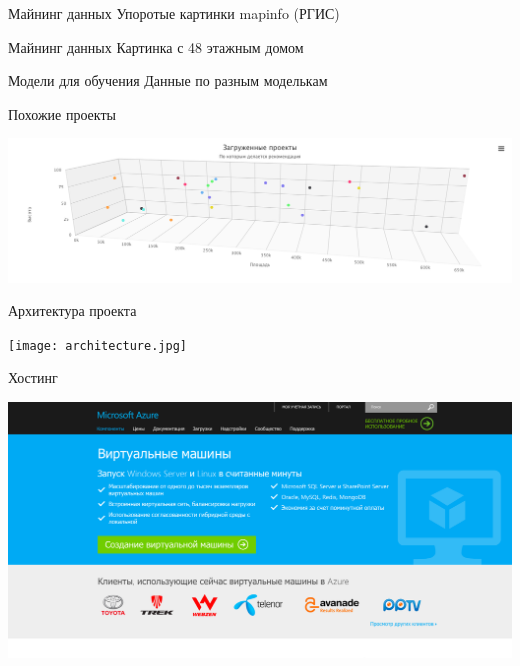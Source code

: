 \documentclass[14pt, fleqn, xcolor={dvipsnames, table}]{beamer}
\begin{document}
        \begin{frame}{Майнинг данных}
            Упоротые картинки mapinfo (РГИС)    
        \end{frame}
        
        \begin{frame}{Майнинг данных}
            Картинка с 48 этажным домом
        \end{frame}
        
        \begin{frame}{Модели для обучения}
            Данные по разным моделькам
        \end{frame}
        
        \begin{frame}{Похожие проекты}
            \begin{center}
                \includegraphics[scale=0.25]{nn.png}
            \end{center}
        \end{frame}
        
        \begin{frame}{Архитектура проекта}
            \begin{center}
                \texttt{[image: architecture.jpg]}
            \end{center}
        \end{frame}
        
        \begin{frame}{Хостинг}
            \begin{center}
                \includegraphics[scale=0.25]{azure.png}
            \end{center}
        \end{frame}
        
\end{document}
